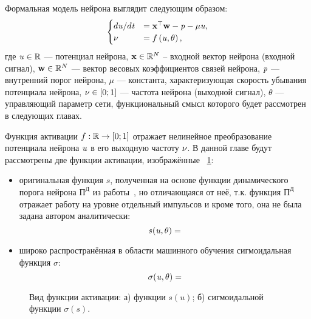 Формальная модель нейрона выглядит следующим образом:
\begin{equation}
	\label{eq:single_neuron_model}
    \begin{cases}
	    d\mathit{u}/d\mathit{t} &= \mathrm{\mathbf{x}}^\top \mathrm{\mathbf{w}} - \mathit{p} - \mu \mathit{u}, \\
        \mathit{\nu}            &= f\left( \mathit{u}, \theta \right), \\
    \end{cases}
\end{equation}
где $\mathit{u} \in \mathbb{R}$ --- потенциал нейрона, $\mathrm{\mathbf{x}} \in \mathbb{R}^{N}$ -- входной вектор нейрона (входной сигнал), $\mathrm{\mathbf{w}} \in \mathbb{R}^{N}$ --- вектор весовых коэффициентов связей нейрона,  $\mathit{p}$ --- внутренний порог нейрона, $\mu$ --- константа, характеризующая скорость убывания потенциала нейрона, $\mathit{\nu} \in \left[0;1\right]$ --- частота нейрона (выходной сигнал), $\theta$ --- управляющий параметр сети, функциональный смысл которого будет рассмотрен в следующих главах.

Функция активации $f: \mathbb{R} \to \left[0;1\right]$ отражает нелинейное преобразование потенциала нейрона $\mathit{u}$ в его выходную частоту $\mathit{\nu}$. В данной главе будут рассмотрены две функции активации, изображённые \onfigure~\ref{img:model_activation_functions}:
\begin{itemize}
	\item оригинальная функция $s$, полученная на основе функции динамического порога нейрона $\text{П}^\text{Д}$ из работы~\cite{EmelyanovYaroslavsky1990}, но отличающаяся от неё, т.к. функция $\text{П}^\text{Д}$ отражает работу на уровне отдельный импульсов и кроме того, она не была задана автором аналитически:
		\begin{equation}
			s(\mathit{u}, \theta) = 
		\end{equation}
	\item широко распространённая в области машинного обучения сигмоидальная функция $\sigma$:
		\begin{equation}
			\sigma(\mathit{u}, \theta) = 
		\end{equation}
\end{itemize}


\begin{figure}[ht]
    \caption{Вид функции активации: а)  функции $s(u)$; б) сигмоидальной функции $\sigma(s)$.}
    \label{img:model_activation_functions}
\end{figure}

